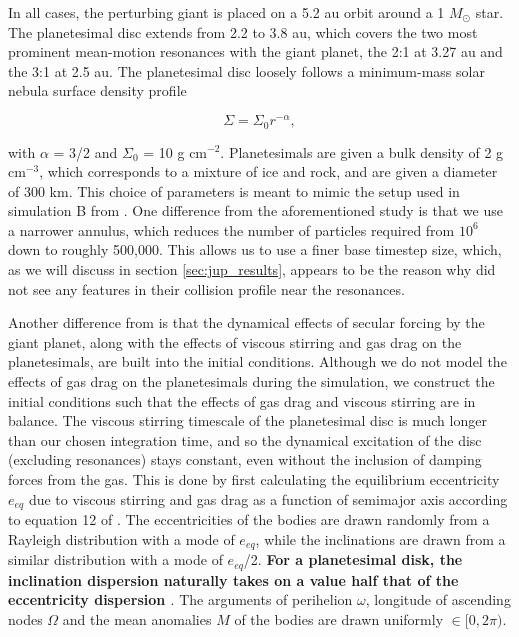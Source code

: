In all cases, the perturbing giant is placed on a 5.2 au orbit around a 1 $M_{\odot}$ star. The 
planetesimal disc extends from 2.2 to 3.8 au, which covers the two most prominent mean-motion resonances with the giant 
planet, the 2:1 at 3.27 au and the 3:1 at 2.5 au. The planetesimal disc loosely follows a minimum-mass solar nebula surface 
density profile \cite{hayashi81}

\begin{equation}\label{eq:surf_den}
	\Sigma = \Sigma_{0} r^{-\alpha},
\end{equation}

\noindent with $\alpha$ = 3/2 and $\Sigma_{0}$ = 10 g cm$^{-2}$. Planetesimals are given a bulk density of 2 g cm$^{-3}$, 
which corresponds to a mixture of ice and rock, and are given a diameter of 300 km. This choice of parameters is meant to 
mimic the setup used in simulation B from \cite{richardson00}. One difference from the aforementioned study is that we use a 
narrower annulus, which reduces the number of particles required from $10^6$ down to roughly 500,000. This allows us to use a 
finer base timestep size, which, as we will discuss in section \ref{sec:jup_results}, appears to be the reason why \cite{richardson00} did not see any features in their collision profile near the resonances.

Another difference from \cite{richardson00} is that the dynamical effects of secular forcing by the giant planet, along with the 
effects of viscous stirring and gas drag on the planetesimals, are built into the initial conditions. Although we do not model the 
effects of gas drag on the planetesimals during the simulation, we construct the initial conditions such that the effects of gas drag 
and viscous stirring are in balance. The viscous stirring timescale of the planetesimal disc is much longer than our chosen 
integration time, and so the dynamical excitation of the disc (excluding resonances) stays constant, even without the inclusion of 
damping forces from the gas. This is done by first calculating the equilibrium eccentricity $e_{eq}$ due to viscous stirring and 
gas drag as a function of semimajor axis according to equation 12 of \cite{kokubo02}. The eccentricities of the bodies are drawn 
randomly from a Rayleigh distribution with a mode of $e_{eq}$, while the inclinations are drawn from a similar distribution with a 
mode of $e_{eq}$/2. \textbf{For a planetesimal disk, the inclination dispersion naturally takes on a value half that of the eccentricity dispersion \cite{ida93a}}. The arguments of perihelion $\omega$, longitude of ascending nodes $\Omega$ and the 
mean anomalies $M$ of the bodies are drawn uniformly $\in [0, 2 \pi)$.

